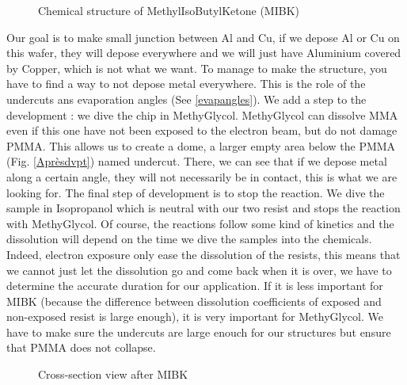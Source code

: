            \begin{figure}[H]
                \centering
                \caption{Chemical structure of MethylIsoButylKetone (MIBK)}
                \label{MIBK}
            \end{figure}
Our goal is to make small junction between Al and Cu, if we depose Al or Cu on this wafer, they will depose everywhere and we will just have Aluminium covered by Copper, which is not what we want. To manage to make the structure, you have to find a way to not depose metal everywhere. This is the role of the undercuts ans evaporation angles (See \ref{evapangles}). We add a step to the development : we dive the chip in MethyGlycol. MethyGlycol can dissolve MMA even if this one have not been exposed to the electron beam, but do not damage PMMA. This allows us to create a dome, a larger empty area below the PMMA (Fig. \ref{Aprèsdvpt}) named undercut. There, we can see that if we depose metal along a certain angle, they will not necessarily be in contact, this is what we are looking for. The final step of development is to stop the reaction. We dive the sample in Isopropanol which is neutral with our two resist and stops the reaction with MethyGlycol.
Of course, the reactions follow some kind of kinetics and the dissolution will depend on the time we dive the samples into the chemicals. Indeed, electron exposure only ease the dissolution of the resists, this means that we cannot just let the dissolution go and come back when it is over, we have to determine the accurate duration for our application. If it is less important for MIBK (because the difference between dissolution coefficients of exposed and non-exposed resist is large enough), it is very important for MethyGlycol. We have to make sure the undercuts are large enouch for our structures but ensure that PMMA does not collapse.
            
            \begin{figure}[H]
                \centering
                \caption{Cross-section view after MIBK}
                \label{aprèsMIBK}
            \end{figure}
            

